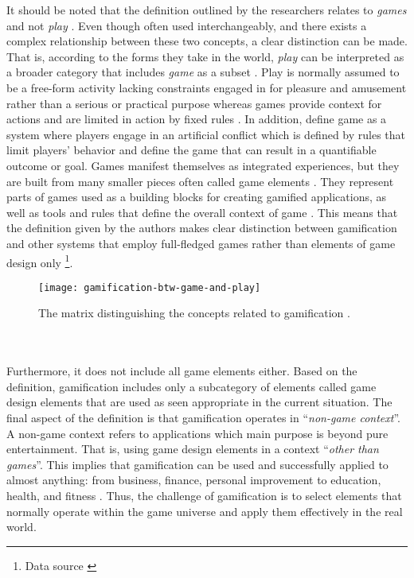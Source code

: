 It should be noted that the definition outlined by the researchers relates to \textit{games} and not \textit{play} \cite{deterding2011game}. Even though often used interchangeably, and there exists a complex relationship between these two concepts, a clear distinction can be made. That is, according to the forms they take in the world, \textit{play} can be interpreted as a broader category that includes \textit{game} as a subset \cite{salen2004rules}. Play is normally assumed to be a free-form activity lacking constraints engaged in for pleasure and amusement rather than a serious or practical purpose whereas games provide context for actions and are limited in action by fixed rules \cite{juul2011half}. In addition, \cite{salen2004rules} define game as a system where players engage in an artificial conflict which is defined by rules that limit players' behavior and define the game that can result in a quantifiable outcome or goal. Games manifest themselves as integrated experiences, but they are built from many smaller pieces often called game elements \cite{werbach2012win}. They represent parts of games used as a building blocks for creating gamified applications, as well as tools and rules that define the overall context of game \cite{gamDesElem}. This means that the definition given by the authors makes clear distinction between gamification and other systems that employ full-fledged games rather than elements of game design only  \footnote{Data source \cite{deterding2011game}}. 
\begin{figure}[h]
    \centering
    \texttt{[image: gamification-btw-game-and-play]}
    \caption{The matrix distinguishing the concepts related to gamification \cite{deterding2011game}.}
    \label{fig:mesh1}
\end{figure}\\\\
Furthermore, it does not include all game elements either. Based on the definition, gamification includes only a subcategory of elements called game design elements that are used as seen appropriate in the current situation. The final aspect of the definition is that gamification operates in ``\textit{non-game context}''. A non-game context refers to applications which main purpose is beyond pure entertainment. That is, using game design elements in a context ``\textit{other than games}''. This implies that gamification can be used and successfully applied to almost anything: from business, finance, personal improvement to education, health, and fitness \cite{deterding2011game}. Thus, the challenge of gamification is to select elements that normally operate within the game universe and apply them effectively in the real world.
